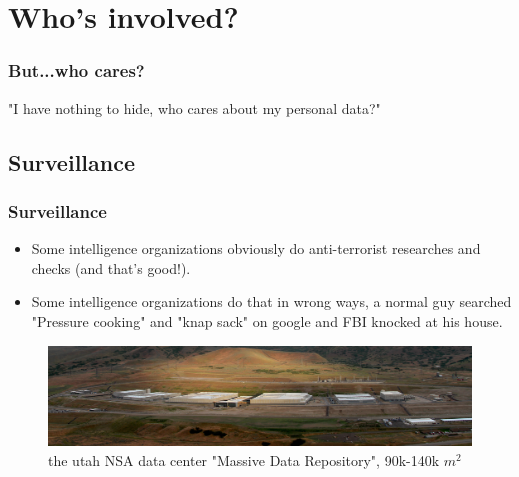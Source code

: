 \section{Who's involved?}
\begin{frame}
	\frametitle{But...who cares?}
	\begin{center}
	\huge{"I have nothing to hide, who cares about my personal data?"}
	\end{center}

\end{frame}

\subsection{Surveillance} 
\begin{frame}
	\frametitle{Surveillance}
	\begin{itemize}
		\item Some intelligence organizations obviously do
		anti-terrorist researches and checks (and that's good!).
		\item Some intelligence organizations do that in wrong ways, a
		normal guy searched "Pressure cooking" and "knap sack" on google and
		FBI knocked at his house.
	\end{itemize}

	\begin{figure}
	\centering
		\includegraphics[scale=0.05]{imgs/utah}
		\caption{the utah NSA data
		center "Massive Data Repository", 90k-140k $m^2$}
	\end{figure}
\end{frame}

